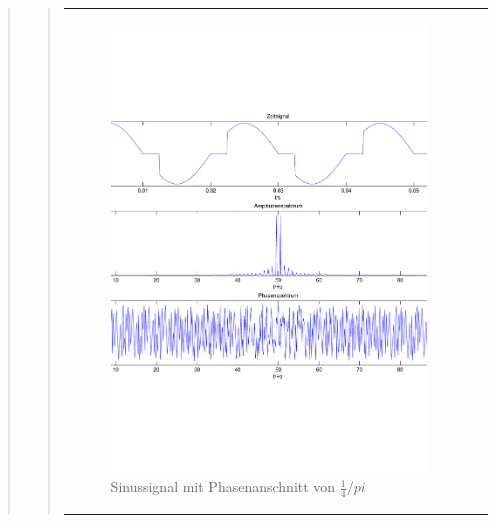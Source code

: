 \begin{quote}
\begin{quote}
            \begin{center}
            \begin{tabular}{ll}

            \hspace{-4em}
                \begin{minipage}{0.6\textwidth}

                    \begin{figure}[H]
                        \label{fig:}
                        \includegraphics[scale=0.3]{./Bilder/Phasenanschnitt28pi.pdf} %
                        \caption{Sinussignal mit Phasenanschnitt von $\frac{1}{4}/pi$}
                    \end{figure}

                \end{minipage}
                \begin{minipage}{0.6\textwidth}


\end{minipage}
\end{tabular}
\end{center}
\end{quote}
\end{quote}
